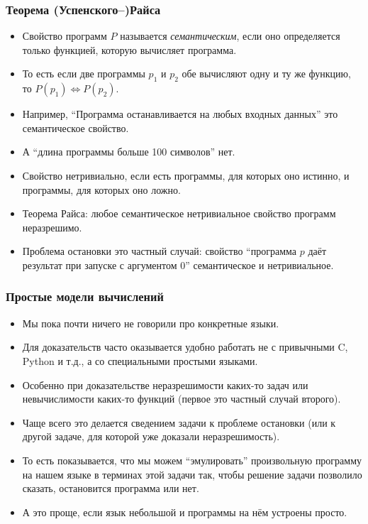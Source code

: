 \documentclass[10pt]{beamer}
\begin{document}
\begin{frame}
    \frametitle{Теорема (Успенского--)Райса}
    \begin{itemize}
        \item Свойство программ $P$ называется \emph{семантическим}, если оно определяется только функцией, которую вычисляет программа.
        \item То есть если две программы $p_1$ и $p_2$ обе вычисляют одну и ту же функцию, то $P(p_1) \Leftrightarrow P(p_2)$.
        \pause
        \item Например, \enquote{Программа останавливается на любых входных данных} это \pause семантическое свойство.
        \item А \enquote{длина программы больше 100 символов} \pause нет.
        \pause
        \item Свойство нетривиально, если есть программы, для которых оно истинно, и программы, для которых оно ложно.
        \item Теорема Райса: любое семантическое нетривиальное свойство программ неразрешимо.
        \pause
        \item Проблема остановки это частный случай: свойство \enquote{программа $p$ даёт результат при запуске с аргументом $0$} семантическое и нетривиальное.
    \end{itemize}
\end{frame}

\begin{frame}
    \frametitle{Простые модели вычислений}
    \begin{itemize}
        \item Мы пока почти ничего не говорили про конкретные языки.
        \item Для доказательств часто оказывается удобно работать не с привычными C, Python и т.д., а со специальными простыми языками.
        \item Особенно при доказательстве неразрешимости каких-то задач или невычислимости каких-то функций \pause (первое это частный случай второго).
        \item Чаще всего это делается сведением задачи к проблеме остановки (или к другой задаче, для которой уже доказали неразрешимость).
        \item То есть показывается, что мы можем \enquote{эмулировать} произвольную программу на нашем языке в терминах этой задачи так, чтобы решение задачи позволило сказать, остановится программа или нет.
        \item А это проще, если язык небольшой и программы на нём устроены просто.
    \end{itemize}
\end{frame}
\end{document}
